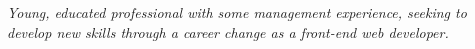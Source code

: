 
\vspace{-1.3em} %

\begin{multicols}{2}  %
\noindent \textit{Young, educated professional with some management experience, seeking to develop new skills through a career change as a front-end web developer.}\\\\












\end{multicols}

